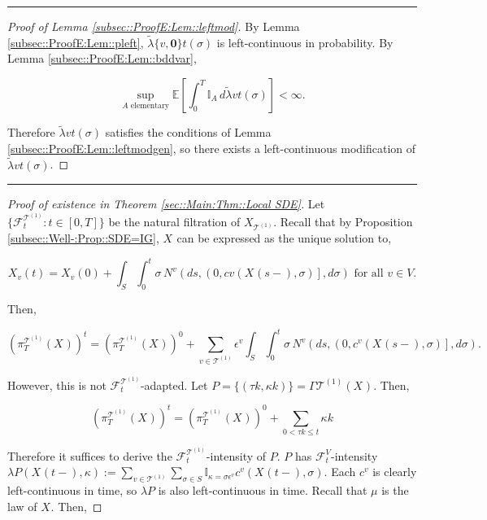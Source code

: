 \documentclass[12pt]{article}
\newcommand{\mb}{\mathbb}
\newcommand{\mc}{\mathcal}
\newcommand{\te}{\text}
\newcommand{\ep}{\epsilon}
\newcommand{\lin}{\rule{\linewidth}{0.4 pt}}
\newcommand{\ex}[1]{\mb{E}\left[#1\right]}			%
\renewcommand{\root}{\mathbf{0}}				%
\renewcommand{\v}{v}							%
\renewcommand{\S}{S}							%
\newcommand{\s}{\sigma}							%
\newcommand{\ev}{\ep}							%
\newcommand{\T}{T}								%
\renewcommand{\t}{t}							%
\newcommand{\proj}{\pi}							%
\renewcommand{\tt}{s}							%
\newcommand{\F}{\mc{F}}							%
\newcommand{\X}{X}								%
\newcommand{\IGr}{c}							%
\newcommand{\vind}[1]{^{#1}}					%
\newcommand{\vsi}[1]{^{#1}}						%
\newcommand{\cind}[1]{_{#1}}					%
\newcommand{\tp}[1]{(#1)}						%
\newcommand{\tip}[1]{#1}						%
\newcommand{\ts}[1]{_{#1}}						%
\newcommand{\tree}{\mc{T}}						%
\newcommand{\sln}[1]{^{(#1)}}						%
\newcommand{\poiss}{N}							%
\newcommand{\rate}{\lambda}						%
\newcommand{\alt}[1]{\widetilde{#1}}			%
\newcommand{\m}{\mu}							%
\newcommand{\rt}{\tau}							%
\renewcommand{\it}{k}							%
\newcommand{\pmap}{\Gamma}						%
\renewcommand{\mark}{\kappa}					%
\newcommand{\rp}{P}								%
\newcommand{\typset}{A}							%
\newcommand{\crate}{\alt{\lambda}}				%
\begin{document}
\lin

\begin{proof}[Proof of Lemma \ref{subsec::ProofE:Lem::leftmod}]

By Lemma \ref{subsec::ProofE:Lem::pleft}, \(\crate{\{\v,\root\}}{\t}(\s)\) is left-continuous in probability. By Lemma \ref{subsec::ProofE:Lem::bddvar},

\[\sup_{\typset\te{ elementary}} \ex{\int_0^\T \mb{I}_{\typset}\,d\crate{\v}{\t}(\s)} < \infty.\]

Therefore \(\crate{\v}{\t}(\s)\) satisfies the conditions of Lemma \ref{subsec::ProofE:Lem::leftmodgen}, so there exists a left-continuous modification of \(\crate{\v}{\t}(\s)\).
\end{proof}

\lin

\begin{proof}[Proof of existence in Theorem \ref{sec::Main:Thm::Local SDE}]

Let \(\{\F\vsi{\tree\sln{1}}\ts{\t}:\t\in [0,\T]\}\) be the natural filtration of \(\X\cind{\tree\sln{1}}\tip{}\). Recall that by Proposition \ref{subsec::Well-:Prop::SDE=IG}, \(\X\cind{}\tip{}\) can be expressed as the unique solution to,

\[\X\cind{\v}\tp{\t} = \X\cind{\v}\tp{0} + \int_\S\int_0^\t \s\,\poiss\vind{\v}\left(d\tt,\left(0,c{\v}(\X\cind{}\tp{\tt-},\s)\right],d\s\right) \te{ for all } \v \in V.\]

Then,

\[\left(\proj\vsi{\tree\sln{1}}\ts{\T}(\X\cind{}\tip{})\right)^\t = \left(\proj\vsi{\tree\sln{1}}\ts{\T}(\X\cind{}\tip{})\right)^0 + \sum_{\v \in \tree\sln{1}}\ev\vind{\v}\int_\S\int_0^\t \s\,\poiss\vind{\v}\left(d\tt,\left(0,\IGr\vind{\v}(\X\cind{}\tp{\tt-},\s)\right],d\s\right).\]

However, this is not \(\F\vsi{\tree\sln{1}}\ts{\t}\)-adapted. Let \(\rp{} = \{(\rt{\it},\mark{\it})\} = \pmap{\tree\sln{1}}(\X\cind{}\tip{}).\) Then,

\[\left(\proj\vsi{\tree\sln{1}}\ts{\T}(\X\cind{}\tip{})\right)^\t = \left(\proj\vsi{\tree\sln{1}}\ts{\T}(\X\cind{}\tip{})\right)^0 + \sum_{0 < \rt{\it} \leq \t}\mark{\it}\]

Therefore it suffices to derive the \(\F\vsi{\tree\sln{1}}\ts{\t}\)-intensity of \(\rp{}\). \(\rp{}\) has \(\F\vsi{V}\ts{\t}\)-intensity \(\rate{\rp{}}(\X\cind{}\tp{\t-},\mark{}) := \sum_{\v \in \tree\sln{1}}\sum_{\s\in \S}\mb{I}_{\mark{} = \s\ev\vind{\v}}\IGr\vind{\v}(\X\cind{}\tp{\t-},\s)\). Each \(\IGr\vind{\v}\) is clearly left-continuous in time, so \(\rate{\rp{}}\) is also left-continuous in time. Recall that \(\m{}{}{}\) is the law of \(\X\cind{}\tip{}\). Then,


\end{proof}
\end{document}
